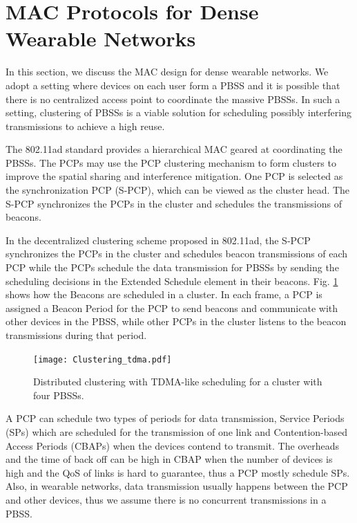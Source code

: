 \documentclass[10pt, conference, letterpaper]{IEEEtran}
\begin{document}
\section{MAC Protocols for Dense Wearable Networks}\label{section:MAC}
In this section, we discuss the MAC design for dense wearable networks. 
We adopt a setting where devices on each user form a PBSS and it is possible that there is no centralized access point to coordinate the massive PBSSs. 
In such a setting, clustering of PBSSs is a viable solution for scheduling possibly interfering transmissions to achieve a high reuse. 

The 802.11ad standard provides a hierarchical MAC geared at coordinating the PBSSs. 
The PCPs may use the PCP clustering mechanism to form clusters to improve the spatial sharing and interference mitigation. One PCP is selected as the synchronization PCP (S-PCP), which can be viewed as the cluster head. 
The S-PCP synchronizes the PCPs in the cluster and schedules the transmissions of beacons.

In the decentralized clustering scheme proposed in 802.11ad, the S-PCP synchronizes the PCPs in the cluster and schedules beacon transmissions of each PCP while the PCPs schedule the data transmission for PBSSs by sending the scheduling decisions in the Extended Schedule element in their beacons. 
Fig. \ref{fig:clustering:tdma} shows how the Beacons are scheduled in a cluster. In each frame, a PCP is assigned a Beacon Period for the PCP to send beacons and communicate with other devices in the PBSS, while other PCPs in the cluster listens to the beacon transmissions during that period.

\begin{figure}
	\centering
	\texttt{[image: Clustering\_tdma.pdf]}
	\caption{Distributed clustering with TDMA-like scheduling for a cluster with four PBSSs.}
	\label{fig:clustering:tdma}
\end{figure}

A PCP can schedule two types of periods for data transmission, Service Periods (SPs) which are scheduled for the transmission of one link and Contention-based Access Periods (CBAPs) when the devices contend to transmit.
The overheads and the time of back off can be high in CBAP when the number of devices is high and the QoS of links is hard to guarantee, thus a PCP mostly schedule SPs.
Also, in wearable networks, data transmission usually happens between the PCP and other devices, thus we assume there is no concurrent transmissions in a PBSS. 
\end{document}
